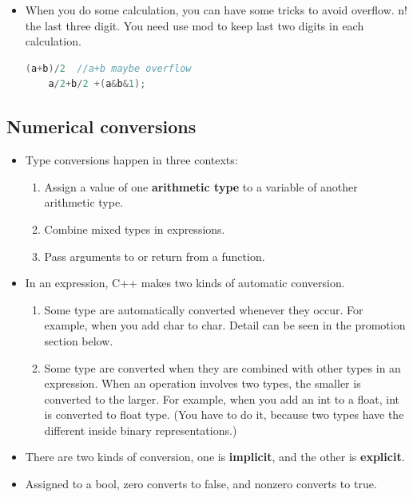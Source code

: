 \documentclass[a4paper,11pt,twoside]{book}
\begin{document}
\begin{itemize}
	\item When you do some calculation, you can have some tricks to avoid overflow. n! the last three digit. You need use mod to keep last two digits in each calculation.
	\begin{lstlisting}[frame=single, language=c++]
	(a+b)/2  //a+b maybe overflow
	a/2+b/2 +(a&b&1);
	\end{lstlisting}
	
\end{itemize}

\subsection{Numerical conversions}

\begin{itemize}
	\item Type conversions happen in three contexts:
	\begin{enumerate}
		\item Assign a value of one \textbf{arithmetic type} to a variable of another arithmetic type.
		
		\item Combine mixed types in expressions.
		
		\item Pass arguments to or return from a function.
	\end{enumerate}
	
	\item In an expression, C++ makes two kinds of automatic conversion.
	\begin{enumerate}
		\item Some type are automatically converted whenever they occur. For example, when you add char to char. Detail can be seen in the promotion section below.
		
		\item Some type are converted when they are combined with other types in an expression. When an operation involves two types, the smaller is converted to the larger. For example, when you add an int to a float, int is converted to float type. (You have to do it, because two types have the different inside binary representations.)
	\end{enumerate}
	
	\item There are two kinds of conversion, one is \textbf{implicit}, and the other is \textbf{explicit}.
	
	\item Assigned to a bool, zero converts to false, and nonzero converts to true.
	

\end{itemize}
\end{document}
